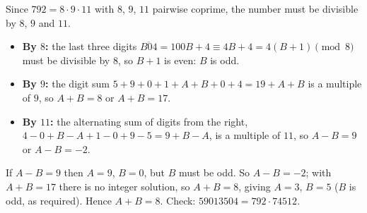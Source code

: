 Since $792=8\cdot9\cdot11$ with $8$, $9$, $11$ pairwise coprime, the number must be divisible by $8$, $9$ and $11$.
\begin{itemize}
\item \textbf{By $8$:} the last three digits $\overline{B04}=100B+4\equiv4B+4=4(B+1)\pmod8$ must be divisible by $8$, so $B+1$ is even: $B$ is odd.
\item \textbf{By $9$:} the digit sum $5+9+0+1+A+B+0+4=19+A+B$ is a multiple of $9$, so $A+B=8$ or $A+B=17$.
\item \textbf{By $11$:} the alternating sum of digits from the right, $4-0+B-A+1-0+9-5=9+B-A$, is a multiple of $11$, so $A-B=9$ or $A-B=-2$.
\end{itemize}
If $A-B=9$ then $A=9$, $B=0$, but $B$ must be odd. So $A-B=-2$; with $A+B=17$ there is no integer solution, so $A+B=8$, giving $A=3$, $B=5$ ($B$ is odd, as required). Hence $A+B=\boxed{8}$. Check: $59013504=792\cdot74512$.

